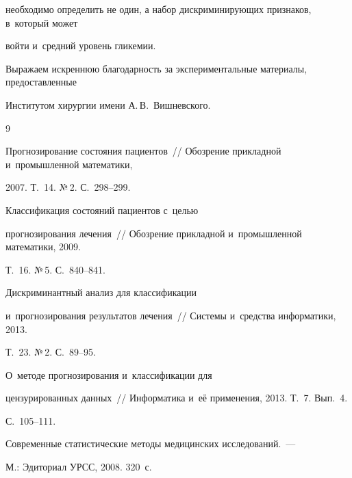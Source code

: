 необходимо определить не один, а набор дискриминирующих признаков, в~который может 

войти и~средний уровень гликемии.



\bigskip



Выражаем искреннюю благодарность за экспериментальные материалы, пред\-остав\-лен\-ные 

Институтом хирургии имени А.\,В.~Вишневского.



{\small\frenchspacing

{%


\begin{thebibliography}{9}



Прогнозирование состояния пациентов~/\!\!/ Обозрение прикладной и~промышленной математики, 

2007. Т.~14. №\,2. С.~298--299.


 Классификация состояний пациентов с~целью 

прогнозирования лечения~/\!\!/ Обозрение прикладной и~промышленной математики, 2009. 

Т.~16. №\,5. С.~840--841.


 Дискриминантный анализ для классификации 

и~прогнозирования результатов лечения~/\!\!/ Системы и~средства информатики, 2013. 

Т.~23. №\,2. С.~89--95.


 О~методе прогнозирования и~классификации для

 цензурированных данных~/\!\!/ Информатика и~её применения, 2013. Т.~7. Вып.~4. 

 С.~105--111.


 Современные статистические методы медицинских исследований.~--- 

М.: Эдиториал УРСС, 2008. 320~с.


\end{thebibliography}}}

